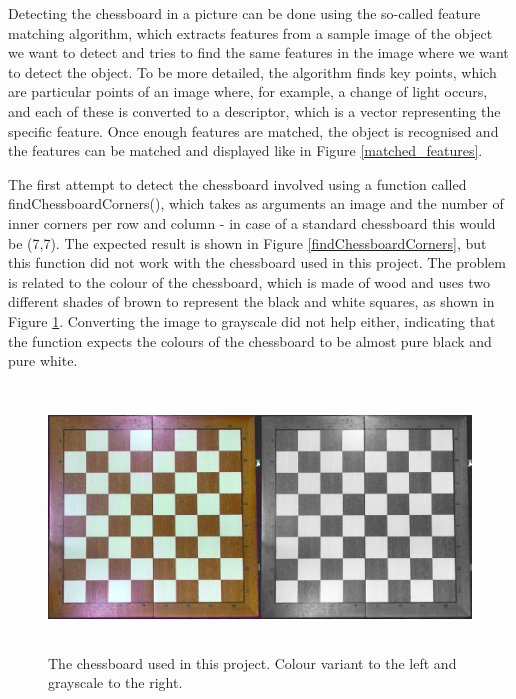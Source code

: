 \documentclass{l4proj}
\begin{document}
Detecting the chessboard in a picture can be done using the so-called feature matching algorithm, which extracts features from a sample image of the object we want to detect and tries to find the same features in the image where we want to detect the object. To be more detailed, the algorithm finds key points, which are particular points of an image where, for example, a change of light occurs, and each of these is converted to a descriptor, which is a vector representing the specific feature. Once enough features are matched, the object is recognised and the features can be matched and displayed like in Figure \ref{matched_features}.


The first attempt to detect the chessboard involved using a function called findChessboardCorners(), which takes as arguments an image and the number of inner corners per row and column - in case of a standard chessboard this would be (7,7). The expected result is shown in Figure \ref{findChessboardCorners}, but this function did not work with the chessboard used in this project. The problem is related to the colour of the chessboard, which is made of wood and uses two different shades of brown to represent the black and white squares, as shown in Figure \ref{MyChessboard}. Converting the image to grayscale did not help either, indicating that the function expects the colours of the chessboard to be almost pure black and pure white.


\begin{figure}[h!]
\vspace{7mm}
\centering
\includegraphics[height=7cm,width=14.5cm]{chessboard_normal_and_b&w.jpg}
\caption{The chessboard used in this project. Colour variant to the left and grayscale to the right.}
\label{MyChessboard}
\end{figure}
\end{document}
